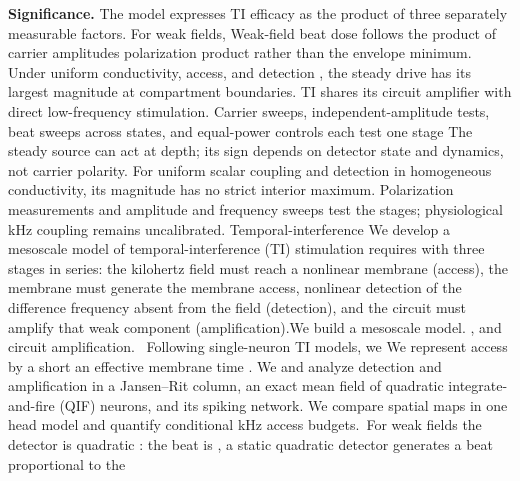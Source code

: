 \documentclass[11pt,a4paper]{article}
\providecommand{\DIFaddtex}[1]{{\protect\color{blue} \sf #1}} %
\providecommand{\DIFdeltex}[1]{{\protect\color{red} \scriptsize #1}} %
\providecommand{\DIFaddbegin}{} %
\providecommand{\DIFaddend}{} %
\providecommand{\DIFdelbegin}{} %
\providecommand{\DIFdelend}{} %
\providecommand{\DIFadd}[1]{\texorpdfstring{\DIFaddtex{#1}}{#1}} %
\providecommand{\DIFdel}[1]{\texorpdfstring{\DIFdeltex{#1}}{}} %
\begin{document}
\textbf{Significance.} \DIFdelbegin \DIFdel{The model expresses TI efficacy as the product of three
separately measurable factors. For weak fields, }\DIFdelend \DIFaddbegin \DIFadd{Weak-field beat }\DIFaddend dose follows the \DIFdelbegin \DIFdel{product of carrier
amplitudes }\DIFdelend \DIFaddbegin \DIFadd{polarization product }\DIFaddend rather than the envelope minimum.
\DIFdelbegin \DIFdel{Under uniform conductivity,
access,
and detection , the steady drive has its largest magnitude at compartment boundaries. TI shares
its circuit amplifier with direct low-frequency stimulation. Carrier sweeps,
independent-amplitude tests, beat sweeps across states, and equal-power controls
each test one stage}\DIFdelend \DIFaddbegin \DIFadd{The steady source can act at depth; its sign depends on detector state and dynamics,
not carrier polarity. For uniform scalar coupling and detection in homogeneous
conductivity, its magnitude has no strict interior maximum. Polarization measurements and amplitude and frequency sweeps test the
stages; physiological kHz coupling remains uncalibrated}\DIFaddend .
\else
\DIFdelbegin \DIFdel{Temporal-interference }\DIFdelend \DIFaddbegin \DIFadd{We develop a mesoscale model of temporal-interference }\DIFaddend (TI) stimulation \DIFdelbegin \DIFdel{requires }\DIFdelend \DIFaddbegin \DIFadd{with }\DIFaddend three stages
in series: \DIFdelbegin \DIFdel{the kilohertz field must reach a
nonlinear membrane (access), the membrane must generate the }\DIFdelend \DIFaddbegin \DIFadd{membrane access, nonlinear detection of the }\DIFaddend difference frequency absent from
the field\DIFdelbegin \DIFdel{(detection), and the circuit must amplify that weak component
(amplification).We build a mesoscale model.}\DIFdelend \DIFaddbegin \DIFadd{, and circuit amplification.}\DIFaddend \ \DIFdelbegin \DIFdel{Following single-neuron TI models, we }\DIFdelend \DIFaddbegin \DIFadd{We }\DIFaddend represent access by \DIFdelbegin \DIFdel{a short }\DIFdelend \DIFaddbegin \DIFadd{an }\DIFaddend effective membrane time \DIFdelbegin \DIFdel{. We }\DIFdelend \DIFaddbegin \DIFadd{and }\DIFaddend analyze detection and
amplification in a Jansen--Rit column, an exact mean field of quadratic
integrate-and-fire \DIFaddbegin \DIFadd{(QIF) }\DIFaddend neurons, and its spiking network. \DIFaddbegin \DIFadd{We compare spatial maps in
one head model and quantify conditional kHz access budgets.}\DIFaddend \ For weak fields\DIFdelbegin \DIFdel{the detector is quadratic : the beat is
}\DIFdelend \DIFaddbegin \DIFadd{, a static quadratic detector generates a beat }\DIFaddend proportional to the
\end{document}
